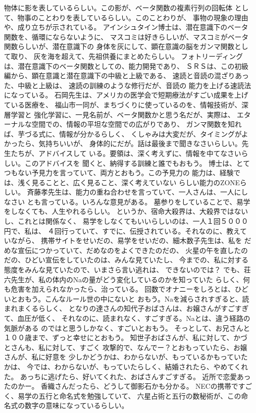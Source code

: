 \documentclass{jsarticle}
\begin{document}
    物体に影を表しているらしい。この影が、ベータ関数の複素行列の回転体
    として、物事のことわりを表しているらしい。このことわりが、
    事物の現象の理由や、成り立ちが示されている。
    アインシュタイン博士は、潜在意識下のベータ関数を、循環にならないように、
    マスコミは好きらしいが、マスコミがベータ関数らしいが、潜在意識下の
    身体を灰にして、顕在意識の脳をガンマ関数として取り、
    灰を海を超えて、先祖供養にまとめたらしい。
    フォトリーディングは、潜在意識下のベータ関数としての、能力開発であり、
    ＳＲＳは、この初級編から、顕在意識と潜在意識下の中級と上級である、
    速読と音読の混ざりあった、中級と上級は、
    速読の訓練のような修行だが、音読の
    能力を上げる速読法になっている。
    石岡先生は、アメリカの医学会で短期療法がすごい成果を上げている医療を、
    福山市一同が、まちづくりに使っているのを、情報技術が、深層学習と
    強化学習に、一見名前が、ベータ関数かと思う名だが、実際は、
    エターナルな空間での、情報の平坦な空間での広がりであり、
    ガンマ関数を知れば、芋づる式に、情報が分かるらしく、
    くしゃみは大変だが、タイミングがよかったら、気持ちいいが、
    身体的にだが。話は最後まで聞きなさいらしい。先生たちが、アドバイスして
    いる。要領は、深く考えずに、情報を中てなさいらしい。このアドバイスを
    聞くと、納得する訓練と誰でもおもう。
    博士は、とてつもない予見力を言っていて、両方とおもう。この予見力の
    能力は、経験では、浅く見ることと、広く見ること、深く考えていない
    らしい能力のZONEらしい。
    斉藤孝先生は、能力の重ね合わせを言っていて、一人さんは、一人にしなさい
    とも言っている。いろんな意見がある。
    墓参りをしていることで、易学をしなくても、人生やれるらしい。
    というか、宿命大殺界は、大殺界ではないし、これとは関係なく、
    易学をしなくてもいいらしいのは、一人１回５０００円で、私は、
    ４回行っていて、すでに、伝授されている。それなのに、教えていながら、
    携帯サイトをせいだの、易学をせいだの、細木数子先生は、私を
    だめな宣伝につかっていて、だめなのをよくできたのだの、
    火星の午を直したのだの、ひどい宣伝をしていたのは、みんな見ていたし、
    今までの、私に対する態度をみんな見ていたので、いまさら言い逃れは、
    できないのでは？
    でも、荘六先生が、私の体内のNaの量がどう変化しているのかを知っていた
    らしく、何も危害を加えられなかったら、治っている。
    回数でオナニーをしろとは、ひどいとおもう。こんなルール世の中にないと
    おもう。Naを減らされすぎると、読まれまくるらしく、
    となりの達さんの知代子おばさんは、お嬢さんがすごすぎて、血圧が低く、
    それなのに、読まれなく、すごすぎる。Naとは、違う経路の気脈がある
    のではと思うしかなく、すごいとおもう。
    そっとして、お兄さんと１００歳まで、ずっと幸せにとおもう。
    知世子おばさんが、私に対して、かづとさんも、私に対して、すごく
    攻撃的で、なんでー？とおもっていたら、お嬢さんが、私に好意を
    少しかどうかは、わからないが、もっているかもっていたかは、
    今では、わからないが、もっていたらしく、結婚されたら、やめてくれた。
    あっちに逃げたら、好いてくれた、おばさんすごすぎる。
    近所で恋愛あったのかー。
    香織さんだったら、どうして御影石かも分かる。
    NECの携帯ですごく、易学の五行と命名式を勉強していて、
    六星占術と五行の数秘術が、この命名式の数字の意味になっているらしい。
\end{document}
